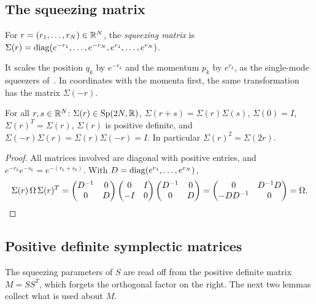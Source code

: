 \begin{vetdenv}
\subsection{The squeezing matrix}

\begin{definition}\label{def:bm-sigma}
For $r=(r_1,\ldots,r_N)\in\mathbb R^N$, the \emph{squeezing matrix} is
$\Sigma(r)=\operatorname{diag}(e^{-r_1},\ldots,e^{-r_N},e^{r_1},\ldots,e^{r_N})$.
\end{definition}

It scales the position $q_k$ by $e^{-r_k}$ and the momentum $p_k$ by $e^{r_k}$, as the single-mode squeezers
of~\cite[(A10), (A28)--(A29)]{tjoacirac}. In coordinates with the momenta first, the same transformation has the
matrix $\Sigma(-r)$.

\begin{lemma}\label{lem:bm-sigma}
For all $r,s\in\mathbb R^N$: $\Sigma(r)\in\mathrm{Sp}(2N,\mathbb R)$, $\Sigma(r+s)=\Sigma(r)\Sigma(s)$, $\Sigma(0)=I$, $\Sigma(r)^T=\Sigma(r)$,
$\Sigma(r)$ is positive definite, and $\Sigma(-r)\Sigma(r)=\Sigma(r)\Sigma(-r)=I$. In particular $\Sigma(r)^2=\Sigma(2r)$.
\end{lemma}

\begin{proof}
All matrices involved are diagonal with positive entries, and $e^{-r_k}e^{-s_k}=e^{-(r_k+s_k)}$. With
$D=\operatorname{diag}(e^{r_1},\ldots,e^{r_N})$,
\[
 \Sigma(r)\,\Omega\,\Sigma(r)^T=\begin{pmatrix}D^{-1}&0\\0&D\end{pmatrix}\begin{pmatrix}0&I\\-I&0\end{pmatrix}
 \begin{pmatrix}D^{-1}&0\\0&D\end{pmatrix}=\begin{pmatrix}0&D^{-1}D\\-DD^{-1}&0\end{pmatrix}=\Omega .\qedhere
\]
\end{proof}

\subsection{Positive definite symplectic matrices}\label{sec:bm-positive}

The squeezing parameters of $S$ are read off from the positive definite matrix $M=SS^T$, which forgets the
orthogonal factor on the right. The next two lemmas collect what is used about $M$.


\end{vetdenv}
